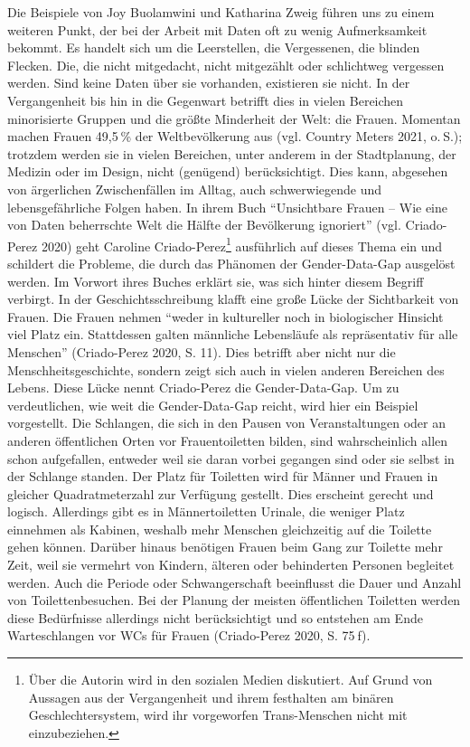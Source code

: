 \documentclass[a4paper,
fontsize=11pt,
oneside,
numbers=noperiodatend,
parskip=half-,
bibliography=totoc,
final
]{scrartcl}
\begin{document}
Die Beispiele von Joy Buolamwini und Katharina Zweig führen uns zu einem
weiteren Punkt, der bei der Arbeit mit Daten oft zu wenig Aufmerksamkeit
bekommt. Es handelt sich um die Leerstellen, die Vergessenen, die
blinden Flecken. Die, die nicht mitgedacht, nicht mitgezählt oder
schlichtweg vergessen werden. Sind keine Daten über sie vorhanden,
existieren sie nicht. In der Vergangenheit bis hin in die Gegenwart
betrifft dies in vielen Bereichen minorisierte Gruppen und die größte
Minderheit der Welt: die Frauen. Momentan machen Frauen 49,5 \% der
Weltbevölkerung aus (vgl. Country Meters 2021, o. S.); trotzdem werden
sie in vielen Bereichen, unter anderem in der Stadtplanung, der Medizin
oder im Design, nicht (genügend) berücksichtigt. Dies kann, abgesehen
von ärgerlichen Zwischenfällen im Alltag, auch schwerwiegende und
lebensgefährliche Folgen haben. In ihrem Buch \enquote{Unsichtbare
Frauen -- Wie eine von Daten beherrschte Welt die Hälfte der Bevölkerung
ignoriert} (vgl. Criado-Perez 2020) geht Caroline
Criado-Perez\footnote{Über die Autorin wird in den sozialen Medien
  diskutiert. Auf Grund von Aussagen aus der Vergangenheit und ihrem
  festhalten am binären Geschlechtersystem, wird ihr vorgeworfen
  Trans-Menschen nicht mit einzubeziehen.} ausführlich auf dieses Thema
ein und schildert die Probleme, die durch das Phänomen der
Gender-Data-Gap ausgelöst werden. Im Vorwort ihres Buches erklärt sie,
was sich hinter diesem Begriff verbirgt. In der Geschichtsschreibung
klafft eine große Lücke der Sichtbarkeit von Frauen. Die Frauen nehmen
\enquote{weder in kultureller noch in biologischer Hinsicht viel Platz
ein. Stattdessen galten männliche Lebensläufe als repräsentativ für alle
Menschen} (Criado-Perez 2020, S. 11). Dies betrifft aber nicht nur die
Menschheitsgeschichte, sondern zeigt sich auch in vielen anderen
Bereichen des Lebens. Diese Lücke nennt Criado-Perez die
Gender-Data-Gap. Um zu verdeutlichen, wie weit die Gender-Data-Gap
reicht, wird hier ein Beispiel vorgestellt. Die Schlangen, die sich in
den Pausen von Veranstaltungen oder an anderen öffentlichen Orten vor
Frauentoiletten bilden, sind wahrscheinlich allen schon aufgefallen,
entweder weil sie daran vorbei gegangen sind oder sie selbst in der
Schlange standen. Der Platz für Toiletten wird für Männer und Frauen in
gleicher Quadratmeterzahl zur Verfügung gestellt. Dies erscheint gerecht
und logisch. Allerdings gibt es in Männertoiletten Urinale, die weniger
Platz einnehmen als Kabinen, weshalb mehr Menschen gleichzeitig auf die
Toilette gehen können. Darüber hinaus benötigen Frauen beim Gang zur
Toilette mehr Zeit, weil sie vermehrt von Kindern, älteren oder
behinderten Personen begleitet werden. Auch die Periode oder
Schwangerschaft beeinflusst die Dauer und Anzahl von Toilettenbesuchen.
Bei der Planung der meisten öffentlichen Toiletten werden diese
Bedürfnisse allerdings nicht berücksichtigt und so entstehen am Ende
Warteschlangen vor WCs für Frauen (Criado-Perez 2020, S. 75 f).
\end{document}
